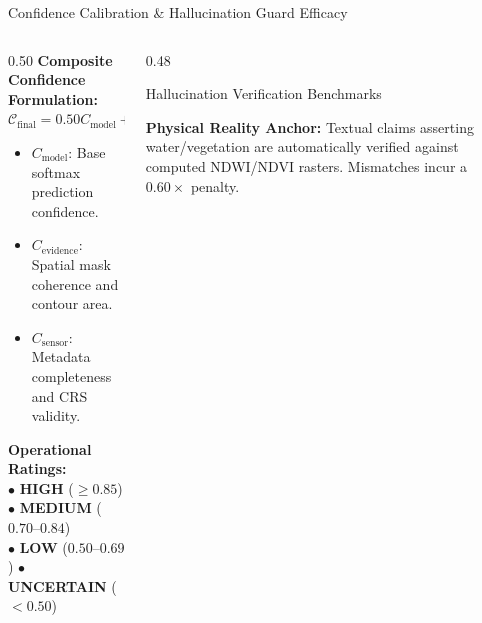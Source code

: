 \documentclass[aspectratio=169, 10pt]{beamer}
\begin{document}
\begin{frame}{Confidence Calibration \& Hallucination Guard Efficacy}
  \vspace{-0.2em}
  \begin{columns}[T]
    \begin{column}{0.50\textwidth}
      \textbf{\color{IEEEDarkBlue}Composite Confidence Formulation:}\\
      $\mathcal{C}_{\text{final}} = 0.50 C_{\text{model}} + 0.35 C_{\text{evidence}} + 0.15 C_{\text{sensor}} - \text{Penalty}$
      \begin{itemize}\setlength{\itemsep}{2pt}\scriptsize
        \item $C_{\text{model}}$: Base softmax prediction confidence.
        \item $C_{\text{evidence}}$: Spatial mask coherence and contour area.
        \item $C_{\text{sensor}}$: Metadata completeness and CRS validity.
      \end{itemize}
      \vspace{0.2em}
      \textbf{Operational Ratings:}\\
      $\bullet$ \textbf{HIGH} ($\ge 0.85$) \quad $\bullet$ \textbf{MEDIUM} ($0.70\text{--}0.84$)\\
      $\bullet$ \textbf{LOW} ($0.50\text{--}0.69$) \quad $\bullet$ \textbf{UNCERTAIN} ($< 0.50$)
    \end{column}

    \begin{column}{0.48\textwidth}
      \begin{block}{\small Hallucination Verification Benchmarks}
        \centering
      \end{block}
      \vspace{0.15em}
      \scriptsize\color{IEEEDarkGray}
      \textbf{Physical Reality Anchor:} Textual claims asserting water/vegetation are automatically verified against computed NDWI/NDVI rasters. Mismatches incur a $0.60\times$ penalty.
    \end{column}
  \end{columns}
\end{frame}
\end{document}
